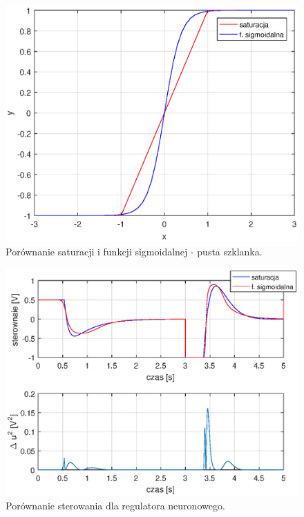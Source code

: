 \begin{figure}[h!]
	\centering
	\includegraphics[scale = 0.8]{fig/por_sat_2.eps}
	\caption		
	{Porównanie saturacji i funkcji sigmoidalnej - pusta szklanka.}
	\label{por_sat2}
\end{figure} 

\begin{figure}[h!]
	\centering
	\includegraphics[scale = 1]{fig/por_ster_n.eps}
	\caption		
	{Porównanie sterowania dla regulatora neuronowego.}
	\label{neuron_ster_por}
\end{figure}
\FloatBarrier


